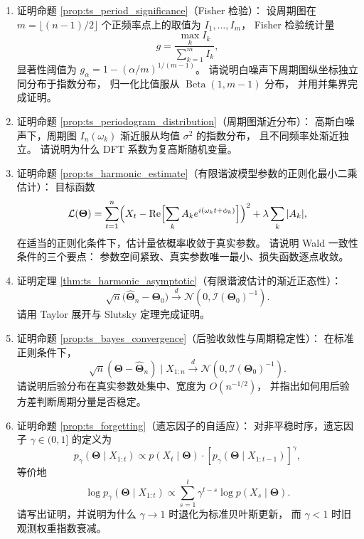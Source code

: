 \begin{enumerate}[leftmargin=3em, label=\textbf{题 \arabic*}]
    \item 证明命题 \ref{prop:ts_period_significance}（Fisher 检验）：
    设周期图在 $m=\lfloor(n-1)/2\rfloor$ 个正频率点上的取值为 $I_1,\dots,I_m$，
    Fisher 检验统计量
    \[
    g=\frac{\max_kI_k}{\sum_{k=1}^mI_k},
    \]
    显著性阈值为 $g_\alpha=1-(\alpha/m)^{1/(m-1)}$。
    请说明白噪声下周期图纵坐标独立同分布于指数分布，
    归一化比值服从 $\operatorname{Beta}(1,m-1)$ 分布，
    并用并集界完成证明。

    \item 证明命题 \ref{prop:ts_periodogram_distribution}（周期图渐近分布）：
    高斯白噪声下，周期图 $I_n(\omega_k)$ 渐近服从均值 $\sigma^2$ 的指数分布，
    且不同频率处渐近独立。
    请说明为什么 DFT 系数为复高斯随机变量。

    \item 证明命题 \ref{prop:ts_harmonic_estimate}（有限谐波模型参数的正则化最小二乘估计）：
    目标函数
    \[
    \mathcal{L}(\boldsymbol{\Theta})=\sum_{t=1}^n
    \Bigl(X_t-\operatorname{Re}\Bigl[\sum_kA_ke^{i(\omega_kt+\phi_k)}\Bigr]\Bigr)^2
    +\lambda\sum_k|A_k|,
    \]
    在适当的正则化条件下，估计量依概率收敛于真实参数。
    请说明 Wald 一致性条件的三个要点：
    参数空间紧致、真实参数唯一最小、损失函数逐点收敛。

    \item 证明定理 \ref{thm:ts_harmonic_asymptotic}（有限谐波估计的渐近正态性）：
    \[
    \sqrt{n}\bigl(\hat{\boldsymbol{\Theta}}_n-\boldsymbol{\Theta}_0\bigr)
    \xrightarrow{d}\mathcal{N}(0,\mathcal{I}(\boldsymbol{\Theta}_0)^{-1}).
    \]
    请用 Taylor 展开与 Slutsky 定理完成证明。

    \item 证明命题 \ref{prop:ts_bayes_convergence}（后验收敛性与周期稳定性）：
    在标准正则条件下，
    \[
    \sqrt{n}(\boldsymbol{\Theta}-\hat{\boldsymbol{\Theta}}_n)\mid X_{1:n}
    \xrightarrow{d}\mathcal{N}(0,\mathcal{I}(\boldsymbol{\Theta}_0)^{-1}).
    \]
    请说明后验分布在真实参数处集中、宽度为 $O(n^{-1/2})$，
    并指出如何用后验方差判断周期分量是否稳定。

    \item 证明命题 \ref{prop:ts_forgetting}（遗忘因子的自适应）：
    对非平稳时序，遗忘因子 $\gamma\in(0,1]$ 的定义为
    \[
    p_\gamma(\boldsymbol{\Theta}\mid X_{1:t})\propto
    p(X_t\mid\boldsymbol{\Theta})\cdot
    [p_\gamma(\boldsymbol{\Theta}\mid X_{1:t-1})]^\gamma,
    \]
    等价地
    \[
    \log p_\gamma(\boldsymbol{\Theta}\mid X_{1:t})\propto
    \sum_{s=1}^t\gamma^{t-s}\log p(X_s\mid\boldsymbol{\Theta}).
    \]
    请写出证明，并说明为什么 $\gamma\to1$ 时退化为标准贝叶斯更新，
    而 $\gamma<1$ 时旧观测权重指数衰减。


\end{enumerate}
